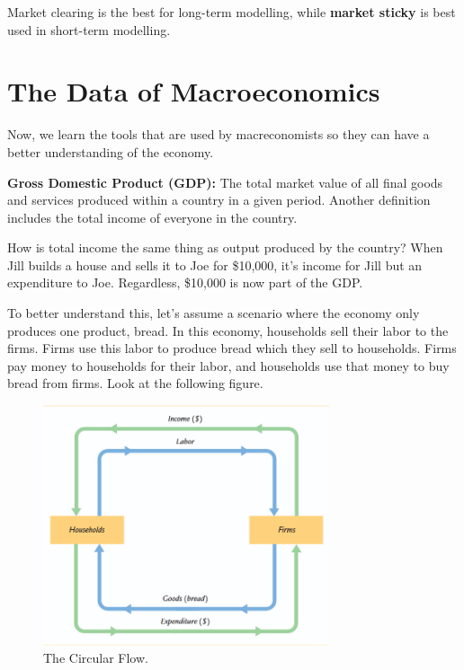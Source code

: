 \documentclass[12pt]{article}
\newcommand{\definition}[2]{
    \begin{tcolorbox}
    \textbf{#1:} #2
    \end{tcolorbox}
}
\newcommand{\formula}[2]{
    \begin{tcolorbox}[colback=blue!5!white]
    \textbf{#1:} \[ #2 \]
    \end{tcolorbox}
}
\begin{document}
Market clearing is the best for long-term modelling, while \textbf{market sticky} is best used in short-term modelling.


\section{The Data of Macroeconomics}

Now, we learn the tools that are used by macreconomists so they can have a better understanding of the economy.

\definition{Gross Domestic Product (GDP)}{The total market value of all final goods and services produced within a country in a given period. Another definition includes the total income of everyone in the country.}


How is total income the same thing as output produced by the country? When Jill builds a house and sells it to Joe for \$10,000, it's income for Jill but an expenditure to Joe. Regardless, \$10,000 is now part of the GDP.

To better understand this, let's assume a scenario where the economy only produces one product, bread. In this economy, households sell their labor to the firms. Firms use this labor to produce bread which they sell to households. Firms pay money to households for their labor, and households use that money to buy bread from firms. Look at the following figure.


\begin{figure}[h!]
    \centering
    \includegraphics[width=0.75\textwidth]{images/flow.png}
    \caption{The Circular Flow.}
    \label{fig:aggregate_demand}
\end{figure}
\end{document}
